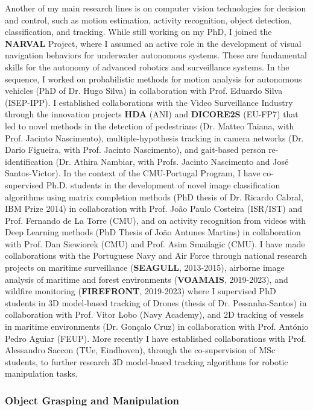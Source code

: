 \documentclass[
]{article}
\begin{document}
Another of my main research lines is on computer vision technologies for
decision and control, such as motion estimation, activity recognition,
object detection, classification, and tracking. While still working on
my PhD, I joined the \textbf{NARVAL} Project, where I assumed an active
role in the development of visual navigation behaviors for underwater
autonomous systems. These are fundamental skills for the autonomy of
advanced robotics and surveillance systems. In the sequence, I worked on
probabilistic methods for motion analysis for autonomous vehicles (PhD
of Dr. Hugo Silva) in collaboration with Prof. Eduardo Silva (ISEP-IPP).
I established collaborations with the Video Surveillance Industry
through the innovation projects \textbf{HDA} (ANI) and \textbf{DICORE2S}
(EU-FP7) that led to novel methods in the detection of pedestrians (Dr.
Matteo Taiana, with Prof. Jacinto Nascimento), multiple-hypothesis
tracking in camera networks (Dr. Dario Figueira, with Prof. Jacinto
Nascimento), and gait-based person re-identification (Dr. Athira
Nambiar, with Profs. Jacinto Nascimento and José Santos-Victor). In the
context of the CMU-Portugal Program, I have co-supervised Ph.D. students
in the development of novel image classification algorithms using matrix
completion methods (PhD thesis of Dr. Ricardo Cabral, IBM Prize 2014) in
collaboration with Prof. João Paulo Costeira (ISR/IST) and Prof.
Fernando de La Torre (CMU), and on activity recognition from videos with
Deep Learning methods (PhD Thesis of João Antunes Martins) in
collaboration with Prof. Dan Siewiorek (CMU) and Prof. Asim Smailagic
(CMU). I have made collaborations with the Portuguese Navy and Air Force
through national research projects on maritime surveillance
(\textbf{SEAGULL}, 2013-2015), airborne image analysis of maritime and
forest environments (\textbf{VOAMAIS}, 2019-2023), and wildfire
monitoring (\textbf{FIREFRONT}, 2019-2023) where I supervised PhD
students in 3D model-based tracking of Drones (thesis of Dr.
Pessanha-Santos) in collaboration with Prof. Vitor Lobo (Navy Academy),
and 2D tracking of vessels in maritime environments (Dr. Gonçalo Cruz)
in collaboration with Prof. António Pedro Aguiar (FEUP). More recently I
have established collaborations with Prof. Alessandro Saccon (TUe,
Eindhoven), through the co-supervision of MSc students, to further
research 3D model-based tracking algorithms for robotic manipulation
tasks.

\subsubsection*{Object Grasping and
Manipulation}\label{object-grasping-and-manipulation}
\end{document}

